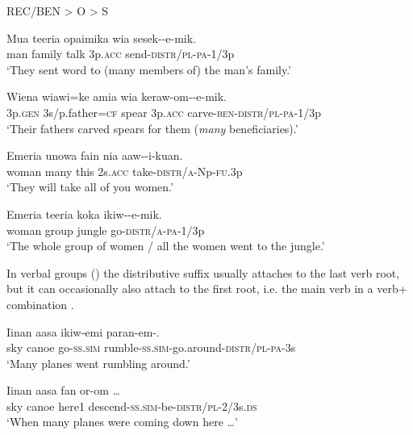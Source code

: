 \ea
REC/BEN {{\textgreater}} O {{\textgreater}} S
\z

\ea%
\label{ex:3:x209}
\gll Mua teeria opaimika wia sesek--e-mik. \\
man family talk 3p.\textsc{acc} send-\textsc{distr}/\textsc{pl}-\textsc{pa}-1/3p \\
\glt`They sent word to (many members of) the man's family.'
\z

\ea%
\label{ex:3:x429}
\gll Wiena wiawi=ke amia wia keraw-om--e-mik. \\
3p.\textsc{gen} 3s/p.father=\textsc{cf} spear 3p.\textsc{acc} carve-\textsc{ben}-\textsc{distr}/\textsc{pl}-\textsc{pa}-1/3p\\
\glt`Their fathers carved spears for them (\textit{many} beneficiaries).'
\z

\ea%
\label{ex:3:x492}
\gll Emeria unowa fain nia aaw--i-kuan. \\
woman many this 2s.\textsc{acc} take-\textsc{distr}/\textsc{a}-Np-\textsc{fu}.3p\\
\glt`They will take all of you women.'
\z

\ea%
\label{ex:3:x491}
\gll Emeria teeria koka ikiw--e-mik. \\
woman group jungle go-\textsc{distr}/\textsc{a}-\textsc{pa}-1/3p\\
\glt`The whole group of women / all the women went to the jungle.'
\z

In verbal groups () the distributive suffix usually attaches to the last verb root, but it can occasionally also attach to the first root, i.e. the main verb in a verb+ combination .

\ea%
\label{ex:3:x207}
\gll Iinan aasa ikiw-emi paran-em-. \\
sky canoe go-\textsc{ss}.\textsc{sim} rumble-\textsc{ss}.\textsc{sim}-go.around-\textsc{distr}/\textsc{pl}-\textsc{pa}-3s\\
\glt `Many planes went rumbling around.'
\z

\ea%
\label{ex:3:x490}
\gll Iinan aasa fan or-om {\dots} \\
sky canoe here1 descend-\textsc{ss}.\textsc{sim}-be-\textsc{distr}/\textsc{pl}-2/3s.\textsc{ds}\\
\glt`When many planes were coming down here {\dots}'
\z

